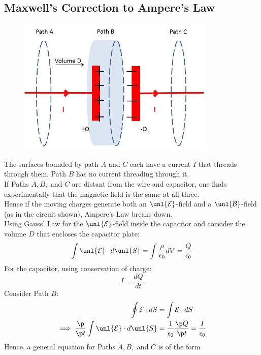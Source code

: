 \documentclass[a4paper, 11pt, normalem]{report}
\renewcommand\E{\mathcal{E}}
\newcommand\uE{\unl{\E}}
\renewcommand\B{\mathcal{B}}
\newcommand\uB{\unl{\B}}
\newcommand\eno{\epsilon_0}
\begin{document}
\subsection{Maxwell's Correction to Ampere's Law}
\begin{figure}
    \begin{center}
        \vspace{-40pt}
        \includegraphics[scale=0.4]{cap4.png}
    \end{center}
\end{figure}
The surfaces bounded by path $A$ and $C$ each have a current $I$ that threads through them.
Path $B$ has no current threading through it. \\
If Paths $A,B,$ and $C$ are distant from the wire and capacitor, one finds experimentally that the magnetic field is the same at all three. \\
Hence if the moving charges generate both an $\uE$-field and a $\uB$-field (as in the circuit shown), Ampere's Law breaks down. \\
Using Gauss' Law for the $\uE$-field inside the capacitor and consider the volume $D$ that encloses the capacitor plate:
\begin{equation}
    \int \uE \cdot d\unl{S} = \int \frac{\rho}{\eno}dV = \frac{Q}{\eno}
\end{equation}
For the capacitor, using conservation of charge:
\begin{equation}
    I = \frac{dQ}{dt}
\end{equation}
Consider Path $B$:
\begin{align}
    \oint \E \cdot dS &= \int \E \cdot dS \\
    \implies \frac{\p}{\p t} \int \uE \cdot d\unl{S} &= \frac{1}{\eno}\frac{\p Q}{\p t} = \frac{I}{\eno}
\end{align}
Hence, a general equation for Paths $A,B,$ and $C$ is of the form
\end{document}
